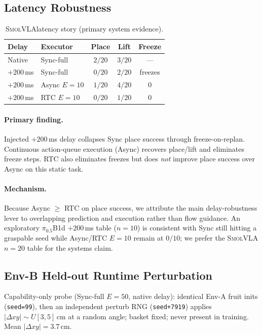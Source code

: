 \documentclass[10pt,twocolumn]{article}
\newcommand{\pifive}{$\pi_{0.5}$}
\newcommand{\smolvla}{\textsc{SmolVLA}}
\begin{document}
\subsection{Latency Robustness}

\begin{table}[t]
\centering
\caption{\smolvla latency story (primary system evidence).}
\label{tab:latency}
\small
\begin{tabular}{llccc}
\toprule
Delay & Executor & Place & Lift & Freeze \\
\midrule
Native & Sync-full & $2/20$ & $3/20$ & --- \\
$+200$\,ms & Sync-full & $0/20$ & $2/20$ & freezes \\
$+200$\,ms & Async $E=10$ & $1/20$ & $4/20$ & $0$ \\
$+200$\,ms & RTC $E=10$ & $0/20$ & $1/20$ & $0$ \\
\bottomrule
\end{tabular}
\end{table}

\paragraph{Primary finding.}
Injected $+200$\,ms delay collapses Sync place success through freeze-on-replan.
Continuous action-queue execution (Async) recovers place/lift and eliminates
freeze steps. RTC also eliminates freezes but does \emph{not} improve place
success over Async on this static task.

\paragraph{Mechanism.}
Because Async $\ge$ RTC on place success, we attribute the main delay-robustness
lever to overlapping prediction and execution rather than flow guidance.
An exploratory \pifive B1d $+200$\,ms table ($n=10$) is consistent with Sync
still hitting a graspable seed while Async/RTC $E=10$ remain at $0/10$; we
prefer the \smolvla $n=20$ table for the systems claim.

\subsection{Env-B Held-out Runtime Perturbation}

Capability-only probe (Sync-full $E=50$, native delay): identical Env-A fruit
inits (\texttt{seed=99}), then an independent perturb RNG
(\texttt{seed+7919}) applies $|\Delta xy|\sim U[3,5]$\,cm at a random angle;
basket fixed; never present in training. Mean $|\Delta xy|=3.7$\,cm.
\end{document}
